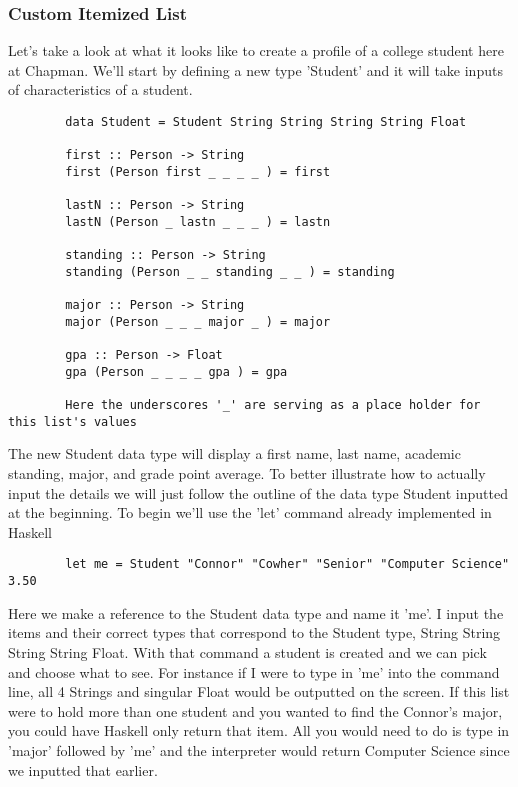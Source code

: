 \documentclass{article}
\begin{document}
    \subsubsection{Custom Itemized List}
    Let's take a look at what it looks like to create a profile of a college student here at Chapman. We'll start by defining a new type 'Student' and it will take inputs of characteristics of a student.
    
    \medskip
    \begin{lstlisting}
        data Student = Student String String String String Float
        
        first :: Person -> String  
        first (Person first _ _ _ _ ) = first
          
        lastN :: Person -> String  
        lastN (Person _ lastn _ _ _ ) = lastn
          
        standing :: Person -> String  
        standing (Person _ _ standing _ _ ) = standing
          
        major :: Person -> String  
        major (Person _ _ _ major _ ) = major
          
        gpa :: Person -> Float  
        gpa (Person _ _ _ _ gpa ) = gpa
        
        Here the underscores '_' are serving as a place holder for this list's values
    \end{lstlisting}
    
    \noindent The new Student data type will display a first name, last name, academic standing, major, and grade point average. To better illustrate how to actually input the details we will just follow the outline of the data type Student inputted at the beginning. To begin we'll use the 'let' command already implemented in Haskell
    
    \begin{lstlisting}
        let me = Student "Connor" "Cowher" "Senior" "Computer Science" 3.50
    \end{lstlisting}
    \noindent Here we make a reference to the Student data type and name it 'me'. I input the items and their correct types that correspond to the Student type, String String String String Float. With that command a student is created and we can pick and choose what to see. For instance if I were to type in 'me' into the command line, all 4 Strings and singular Float would be outputted on the screen. If this list were to hold more than one student and you wanted to find the Connor's major, you could have Haskell only return that item. All you would need to do is type in 'major' followed by 'me' and the interpreter would return Computer Science since we inputted that earlier. 
    
\end{document}
